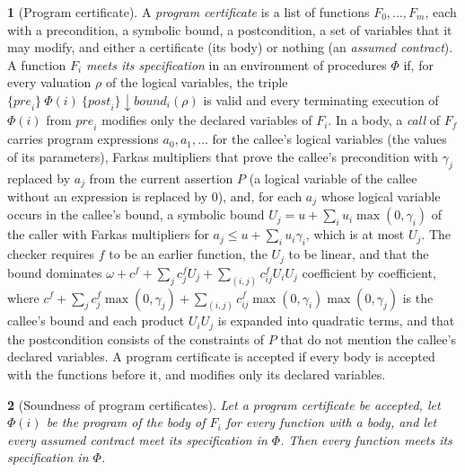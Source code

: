 \documentclass[oneside,english]{amsart}
\numberwithin{equation}{section}
\numberwithin{figure}{section}
\theoremstyle{plain}
\newtheorem{thm}{\protect\theoremname}
\theoremstyle{definition}
\newtheorem{defn}[thm]{\protect\definitionname}
\theoremstyle{plain}
\theoremstyle{remark}
\theoremstyle{plain}
\theoremstyle{definition}
\theoremstyle{plain}
\theoremstyle{remark}
\providecommand{\definitionname}{Definition}
\providecommand{\theoremname}{Theorem}
\begin{document}
\begin{defn}[Program certificate]
\label{def:program-certificate}
A \emph{program certificate} is a list of functions $F_0, \dots, F_m$, each with a precondition, a symbolic bound, a postcondition, a set of variables that it may modify, and either a certificate (its body) or nothing (an \emph{assumed contract}). A function $F_i$ \emph{meets its specification} in an environment of procedures $\Phi$ if, for every valuation $\rho$ of the logical variables, the triple $\{\mathit{pre}_i\}\ \Phi(i)\ \{\mathit{post}_i\}\!\downarrow\!\mathit{bound}_i(\rho)$ is valid and every terminating execution of $\Phi(i)$ from $\mathit{pre}_i$ modifies only the declared variables of $F_i$. In a body, a \emph{call} of $F_f$ carries program expressions $a_0, a_1, \dots$ for the callee's logical variables (the values of its parameters), Farkas multipliers that prove the callee's precondition with $\gamma_j$ replaced by $a_j$ from the current assertion $P$ (a logical variable of the callee without an expression is replaced by $0$), and, for each $a_j$ whose logical variable occurs in the callee's bound, a symbolic bound $U_j = u + \sum_i u_i \max(0, \gamma_i)$ of the caller with Farkas multipliers for $a_j \le u + \sum_i u_i \gamma_i$, which is at most $U_j$. The checker requires $f$ to be an earlier function, the $U_j$ to be linear, and that the bound dominates $\omega + c^f + \sum_j c^f_j U_j + \sum_{(i,j)} c^f_{ij} U_i U_j$ coefficient by coefficient, where $c^f + \sum_j c^f_j \max(0,\gamma_j) + \sum_{(i,j)} c^f_{ij} \max(0,\gamma_i)\max(0,\gamma_j)$ is the callee's bound and each product $U_i U_j$ is expanded into quadratic terms, and that the postcondition consists of the constraints of $P$ that do not mention the callee's declared variables. A program certificate is accepted if every body is accepted with the functions before it, and modifies only its declared variables.
\end{defn}

\begin{thm}[Soundness of program certificates]
\label{thm:program-soundness}
Let a program certificate be accepted, let $\Phi(i)$ be the program of the body of $F_i$ for every function with a body, and let every assumed contract meet its specification in $\Phi$. Then every function meets its specification in $\Phi$.
\end{thm}
\end{document}
